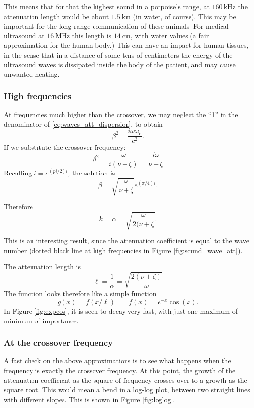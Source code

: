 This means that for that the highest sound in a porpoise's range, at
$\SI{160}{\kilo\hertz}$ the attenuation length would be about
$\SI{1.5}{\kilo\meter}$ (in water, of course). This may be important
for the long-range communication of these animals. For medical
ultrasound at $\SI{16}{\mega\hertz}$ this length is
$\SI{14}{\centi\meter}$, with water values (a fair approximation for
the human body.) This can have an impact for human tissues, in the
sense that in a distance of some tens of centimeters the energy of the
ultrasound waves is dissipated inside the body of the patient, and may
cause unwanted heating.

\subsubsection{High frequencies}

At frequencies much higher than the crossover, we may neglect the
``1'' in the denominator of \ref{eq:waves_att_dispersion}, to obtain
\[
\beta^2 = \frac{i \omega\omega_\mathrm{c}}{c^2} .
\]
If we substitute the crossover frequency:
\[
\beta^2 = \frac{\omega}{i(\nu+\zeta)} =\frac{i \omega}{\nu+\zeta} 
\]
Recalling $i = e^{(pi/2)i} $, the solution is
\[
\beta =\sqrt{ \frac{\omega}{ \nu + \zeta }} e^{(\pi/4)i}.
\]

Therefore
\[
k=\alpha =\sqrt{\frac{\omega}{ 2 (\nu+ \zeta}}.
\]

This is an interesting result, since the attenuation coefficient is
equal to the wave number (dotted black line at high frequencies in
Figure \ref{fig:sound_wave_att}).

The attenuation length is
\[
\ell= \frac{1}{\alpha}=\sqrt{\frac{ 2 (\nu+ \zeta)}{\omega}}
\]
The function looks therefore like a simple function
\[
g(x)= f(x/\ell) \qquad  f(x) = e^{-x}\cos(x) .
\]
In Figure \ref{fig:expcos}, it is seen to decay very fast, with just
one maximum of minimum of importance.



\subsubsection{At the crossover frequency}


A fast check on the above approximations is to see what happens when
the frequency is exactly the crossover frequency. At this point, the
growth of the attenuation coefficient as the square of frequency
crosses over to a growth as the square root. This would mean a bend in
a log-log plot, between two straight lines with different slopes. This
is shown in Figure \ref{fig:loglog}.

